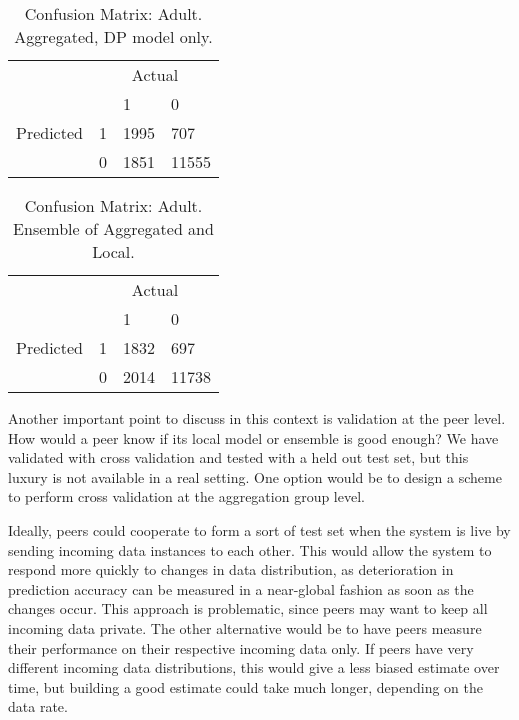\begin{table}[h]
	\centering
	\caption{Confusion Matrix: Adult. Aggregated, DP model only.}
	\label{fig:confmat_adult_aggdp}
	\begin{tabular}{llll}
		& \multicolumn{3}{c}{Actual}                                                      \\
		\multicolumn{1}{c}{} &                        & 1                         & 0                          \\ \cline{3-4} 
		Predicted            & \multicolumn{1}{l|}{1} & \multicolumn{1}{l|}{1995} & \multicolumn{1}{l|}{707}   \\ \cline{3-4} 
		& \multicolumn{1}{l|}{0} & \multicolumn{1}{l|}{1851} & \multicolumn{1}{l|}{11555} \\ \cline{3-4} 
	\end{tabular}
\end{table}

\begin{table}[h]
	\centering
	\caption{Confusion Matrix: Adult. Ensemble of Aggregated and Local.}
	\label{fig:confmat_adult_ensemble}
	\begin{tabular}{llll}
		& \multicolumn{3}{c}{Actual} \\
		\multicolumn{1}{c}{} &                        & 1                         & 0                          \\ \cline{3-4} 
		Predicted            & \multicolumn{1}{l|}{1} & \multicolumn{1}{l|}{1832} & \multicolumn{1}{l|}{697}   \\ \cline{3-4} 
		& \multicolumn{1}{l|}{0} & \multicolumn{1}{l|}{2014} & \multicolumn{1}{l|}{11738} \\ \cline{3-4} 
	\end{tabular}
\end{table}

Another important point to discuss in this context is validation at the peer level. How would a peer know if its local model or ensemble is good enough? We have validated with cross validation and tested with a held out test set, but this luxury is not available in a real setting. One option would be to design a scheme to perform cross validation at the aggregation group level.

Ideally, peers could cooperate to form a sort of test set when the system is live by sending incoming data instances to each other. This would allow the system to respond more quickly to changes in data distribution, as deterioration in prediction accuracy can be measured in a near-global fashion as soon as the changes occur. This approach is problematic, since peers may want to keep all incoming data private. The other alternative would be to have peers measure their performance on their respective incoming data only. If peers have very different incoming data distributions, this would give a less biased estimate over time, but building a good estimate could take much longer, depending on the data rate.


